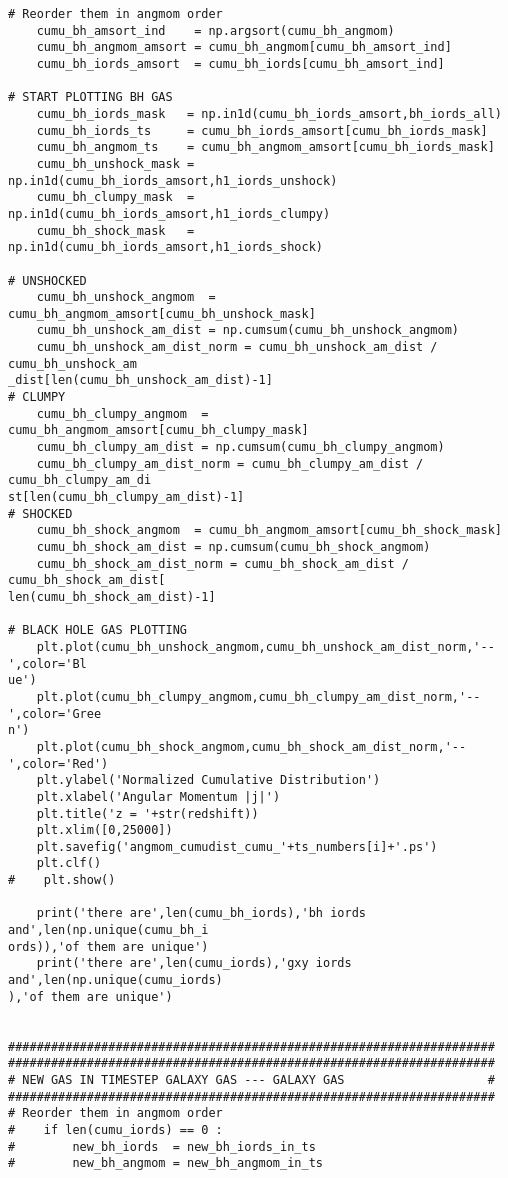 \documentclass[12pt,headA,chapB]{fiskthesis}
\begin{document}
\begin{verbatim}
# Reorder them in angmom order    
    cumu_bh_amsort_ind    = np.argsort(cumu_bh_angmom)
    cumu_bh_angmom_amsort = cumu_bh_angmom[cumu_bh_amsort_ind]
    cumu_bh_iords_amsort  = cumu_bh_iords[cumu_bh_amsort_ind] 

# START PLOTTING BH GAS
    cumu_bh_iords_mask   = np.in1d(cumu_bh_iords_amsort,bh_iords_all)
    cumu_bh_iords_ts     = cumu_bh_iords_amsort[cumu_bh_iords_mask]
    cumu_bh_angmom_ts    = cumu_bh_angmom_amsort[cumu_bh_iords_mask]    
    cumu_bh_unshock_mask = np.in1d(cumu_bh_iords_amsort,h1_iords_unshock)
    cumu_bh_clumpy_mask  = np.in1d(cumu_bh_iords_amsort,h1_iords_clumpy)
    cumu_bh_shock_mask   = np.in1d(cumu_bh_iords_amsort,h1_iords_shock)

# UNSHOCKED
    cumu_bh_unshock_angmom  = cumu_bh_angmom_amsort[cumu_bh_unshock_mask]
    cumu_bh_unshock_am_dist = np.cumsum(cumu_bh_unshock_angmom)
    cumu_bh_unshock_am_dist_norm = cumu_bh_unshock_am_dist / cumu_bh_unshock_am
_dist[len(cumu_bh_unshock_am_dist)-1]
# CLUMPY
    cumu_bh_clumpy_angmom  = cumu_bh_angmom_amsort[cumu_bh_clumpy_mask]
    cumu_bh_clumpy_am_dist = np.cumsum(cumu_bh_clumpy_angmom)
    cumu_bh_clumpy_am_dist_norm = cumu_bh_clumpy_am_dist / cumu_bh_clumpy_am_di
st[len(cumu_bh_clumpy_am_dist)-1]
# SHOCKED
    cumu_bh_shock_angmom  = cumu_bh_angmom_amsort[cumu_bh_shock_mask]
    cumu_bh_shock_am_dist = np.cumsum(cumu_bh_shock_angmom)
    cumu_bh_shock_am_dist_norm = cumu_bh_shock_am_dist / cumu_bh_shock_am_dist[
len(cumu_bh_shock_am_dist)-1]

# BLACK HOLE GAS PLOTTING
    plt.plot(cumu_bh_unshock_angmom,cumu_bh_unshock_am_dist_norm,'--',color='Bl
ue')
    plt.plot(cumu_bh_clumpy_angmom,cumu_bh_clumpy_am_dist_norm,'--',color='Gree
n')
    plt.plot(cumu_bh_shock_angmom,cumu_bh_shock_am_dist_norm,'--',color='Red')
    plt.ylabel('Normalized Cumulative Distribution')
    plt.xlabel('Angular Momentum |j|')
    plt.title('z = '+str(redshift))
    plt.xlim([0,25000])
    plt.savefig('angmom_cumudist_cumu_'+ts_numbers[i]+'.ps')
    plt.clf()
#    plt.show()

    print('there are',len(cumu_bh_iords),'bh iords and',len(np.unique(cumu_bh_i
ords)),'of them are unique')
    print('there are',len(cumu_iords),'gxy iords and',len(np.unique(cumu_iords)
),'of them are unique')


####################################################################
####################################################################
# NEW GAS IN TIMESTEP GALAXY GAS --- GALAXY GAS                    #
####################################################################
# Reorder them in angmom order
#    if len(cumu_iords) == 0 :
#        new_bh_iords  = new_bh_iords_in_ts
#        new_bh_angmom = new_bh_angmom_in_ts
    

\end{verbatim}
\end{document}

